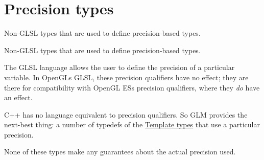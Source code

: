 \hypertarget{group__core__precision}{}\section{Precision types}
\label{group__core__precision}


Non-\/\+G\+L\+S\+L types that are used to define precision-\/based types.  


Non-\/\+G\+L\+S\+L types that are used to define precision-\/based types. 

The G\+L\+S\+L language allows the user to define the precision of a particular variable. In Open\+G\+L\textquotesingle{}s G\+L\+S\+L, these precision qualifiers have no effect; they are there for compatibility with Open\+G\+L E\+S\textquotesingle{}s precision qualifiers, where they {\itshape do} have an effect.

C++ has no language equivalent to precision qualifiers. So G\+L\+M provides the next-\/best thing\+: a number of typedefs of the \hyperlink{group__core__template}{Template types} that use a particular precision.

None of these types make any guarantees about the actual precision used. 